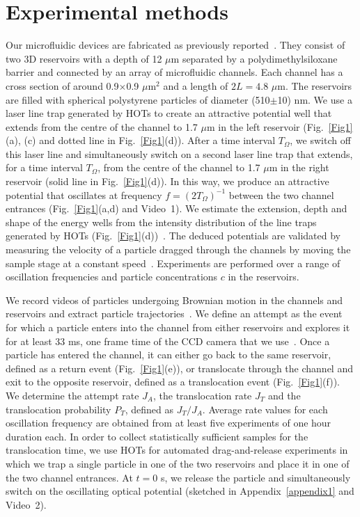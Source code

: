\documentclass[
 reprint,
 aps, showkeys, showpacs
]{revtex4-1}
\begin{document}
\section{Experimental methods}
Our microfluidic devices are fabricated as previously reported~\cite{Pagliara2011,Pagliara2014d}. They consist of two 3D reservoirs with a depth of 12 $\mu$m separated by a polydimethylsiloxane barrier and connected by an array of microfluidic channels. Each channel has a cross section of around 0.9$\times$0.9 $\mu$m$^2$ and a length of $2L=4.8$ $\mu$m. The reservoirs are filled with spherical polystyrene particles of diameter (510$\pm$10) nm. We use a laser line trap generated by HOTs to create an attractive potential well that extends from the centre of the channel to 1.7 $\mu$m in the left reservoir (Fig.~\ref{Fig1}(a), (c) and dotted line in Fig.~\ref{Fig1}(d)). After a time interval $T_{\Omega}$, we switch off this laser line and simultaneously switch on a second laser line trap that extends, for a time interval $T_{\Omega}$, from the centre of the channel to 1.7 $\mu$m
in the right reservoir (solid line in Fig.~\ref{Fig1}(d)). In this way, we produce an attractive potential that oscillates at frequency $f=(2T_{\Omega})^{-1}$ between the two channel entrances (Fig.~\ref{Fig1}(a,d) and Video~1). We estimate the extension, depth and shape of the energy wells from the intensity distribution of the line traps generated by HOTs (Fig.~\ref{Fig1}(d))~\cite{Pelton2004,Hayashi2008}. The deduced potentials are validated by measuring the velocity of a particle dragged through the channels by moving the sample stage at a constant speed~\cite{Juniper2012a}. Experiments are performed over a range of oscillation frequencies and particle concentrations $c$ in the reservoirs. 

We record videos of particles undergoing Brownian motion in the channels and reservoirs and extract particle trajectories~\cite{Introduction1996,Dettmer2014b}. We define an attempt as the event for which a particle enters into the channel from either reservoirs and explores it for at least 33 ms, one frame time of the CCD camera that we use~\cite{Pagliara2014e}. Once a particle has entered the channel, it can either go back to the same reservoir, defined as a return event (Fig.~\ref{Fig1}(e)), or translocate through the channel and exit to the opposite reservoir, defined as a translocation event (Fig.~\ref{Fig1}(f)). We determine the attempt rate $J_A$, the translocation rate $J_T$ and the translocation probability $P_T$, defined as ${J_T}/{J_A}$. Average rate values for each oscillation frequency are obtained from at least five experiments of one hour duration each. In order to collect statistically sufficient samples for the translocation time, we use HOTs for automated drag-and-release experiments in which we trap a single particle in one of the two reservoirs and place it in one of the two channel entrances. At $t = 0$ s, we release the particle and simultaneously switch on the oscillating optical potential (sketched in Appendix~\ref{appendix1} and Video~2).
\end{document}
